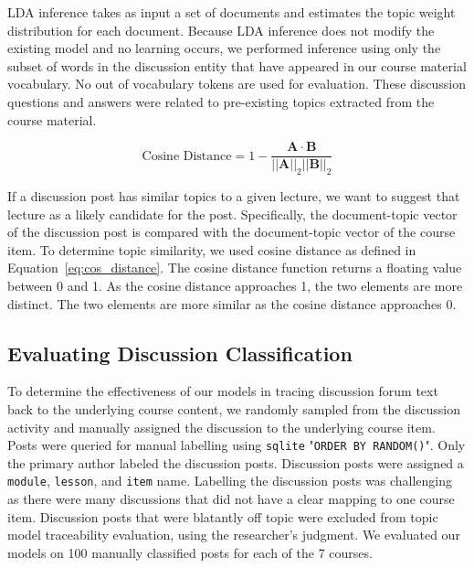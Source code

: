 \documentclass[sigconf, anonymous]{acmart}
\begin{document}
LDA inference takes as input a set of documents and estimates the topic weight distribution for each document.
Because LDA inference does not modify the existing model and no learning occurs, we performed inference using only the subset of words in the discussion entity that have appeared in our course material vocabulary.
No out of vocabulary tokens are used for evaluation.
These discussion questions and answers were related to pre-existing topics extracted from the course material.

\begin{equation}
    \text{Cosine Distance} = 1 - \frac {\pmb A \cdot \pmb B}{||\pmb A||_2 ||\pmb B||_2}
    \label{eq:cos_distance}
\end{equation}

If a discussion post has similar topics to a given lecture, we want to suggest that lecture as a likely candidate for the post.
Specifically, the document-topic vector of the discussion post is compared with the document-topic vector of the course item.
To determine topic similarity, we used cosine distance as defined in Equation~\ref{eq:cos_distance}.
The cosine distance function returns a floating value between 0 and 1. As the cosine distance approaches 1, the two elements are more distinct. The two elements are more similar as the cosine distance approaches 0.


\subsection{Evaluating Discussion Classification}


To determine the effectiveness of our models in tracing discussion forum text back to the underlying course content, we randomly sampled from the discussion activity and manually assigned the discussion to the underlying course item.
Posts were queried for manual labelling using \texttt{sqlite} "\texttt{ORDER BY RANDOM()}".
Only the primary author labeled the discussion posts.
Discussion posts were assigned a \texttt{module}, \texttt{lesson}, and \texttt{item} name.
Labelling the discussion posts was challenging as there were many discussions that did not have a clear mapping to one course item.
Discussion posts that were blatantly off topic were excluded from topic model traceability evaluation, using the researcher's judgment.
We evaluated our models on 100 manually classified posts for each of the 7 courses.
\end{document}
